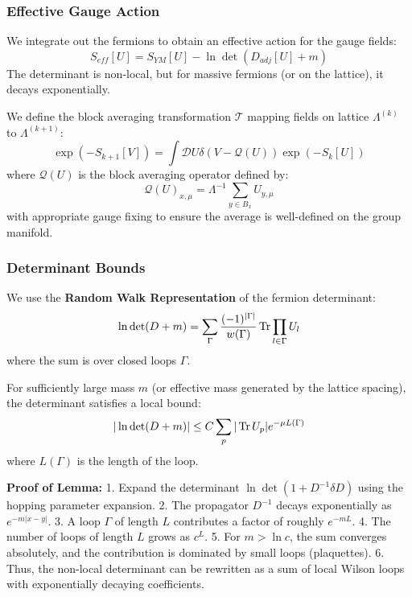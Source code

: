 \subsubsection{Effective Gauge Action}

We integrate out the fermions to obtain an effective action for the gauge fields:
\begin{equation}
S_{eff}[U] = S_{YM}[U] - \ln \det(D_{adj}[U] + m)
\end{equation}
The determinant is non-local, but for massive fermions (or on the lattice), it decays exponentially.

\begin{definition}
We define the block averaging transformation $\mathcal{T}$ mapping fields on lattice $\Lambda^{(k)}$ to $\Lambda^{(k+1)}$:
\begin{equation}
\exp(-S_{k+1}[V]) = \int \mathcal{D}U \delta(V - \mathcal{Q}(U)) \exp(-S_k[U])
\end{equation}
where $\mathcal{Q}(U)$ is the block averaging operator defined by:
\begin{equation}
\mathcal{Q}(U)_{x, \mu} = \Lambda^{-1} \sum_{y \in B_x} U_{y, \mu}
\end{equation}
with appropriate gauge fixing to ensure the average is well-defined on the group manifold.
\end{definition}

\subsubsection{Determinant Bounds}

We use the \textbf{Random Walk Representation} of the fermion determinant:
\begin{equation}
\ln \det(D+m) = \sum_{\Gamma} \frac{(-1)^{|\Gamma|}}{w(\Gamma)} \operatorname{Tr} \prod_{l \in \Gamma} U_l
\end{equation}
where the sum is over closed loops $\Gamma$.

\begin{lemma}
For sufficiently large mass $m$ (or effective mass generated by the lattice spacing), the determinant satisfies a local bound:
\begin{equation}
|\ln \det(D+m)| \le C \sum_p |\operatorname{Tr} U_p| e^{-\mu L(\Gamma)}
\end{equation}
where $L(\Gamma)$ is the length of the loop.
\end{lemma}

\textbf{Proof of Lemma:}
1.  Expand the determinant $\ln \det (1 + D^{-1} \delta D)$ using the hopping parameter expansion.
2.  The propagator $D^{-1}$ decays exponentially as $e^{-m |x-y|}$.
3.  A loop $\Gamma$ of length $L$ contributes a factor of roughly $e^{-m L}$.
4.  The number of loops of length $L$ grows as $c^L$.
5.  For $m > \ln c$, the sum converges absolutely, and the contribution is dominated by small loops (plaquettes).
6.  Thus, the non-local determinant can be rewritten as a sum of local Wilson loops with exponentially decaying coefficients.

